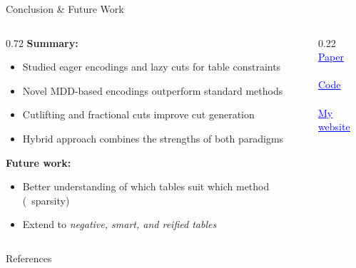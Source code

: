 \documentclass[aspectratio=169]{beamer}
\begin{document}
\begin{frame}{Conclusion \& Future Work}
\begin{columns}[T]
\begin{column}{0.72\textwidth}
\textbf{Summary:}
\begin{itemize}
    \item Studied eager encodings and lazy cuts for table constraints
    \item Novel MDD-based encodings outperform standard methods
    \item Cutlifting and fractional cuts improve cut generation
    \item Hybrid approach combines the strengths of both paradigms
\end{itemize}

\bigskip
\textbf{Future work:}
\begin{itemize}
    \item Better understanding of which tables suit which method (\eg~sparsity)
    \item Extend to \emph{negative, smart, and reified tables}
\end{itemize}
\end{column}
\begin{column}{0.22\textwidth}
\centering
\\[-2pt]
\href{https://doi.org/10.4230/LIPIcs.CP.2026.6}{\textcolor{blue}{\underline{\scriptsize Paper}}}\\[6pt]
\\[-2pt]
\href{https://github.com/ML-KULeuven/table-constraints-for-integer-programming}{\textcolor{blue}{\underline{\scriptsize Code}}}\\[6pt]
\\[-2pt]
\href{https://www.hbierlee.one}{\textcolor{blue}{\underline{\scriptsize My website}}}
\end{column}
\end{columns}
\end{frame}

\begin{frame}[allowframebreaks]{References}
\tiny


\end{frame}

\appendix
\cutliftSection
\end{document}
